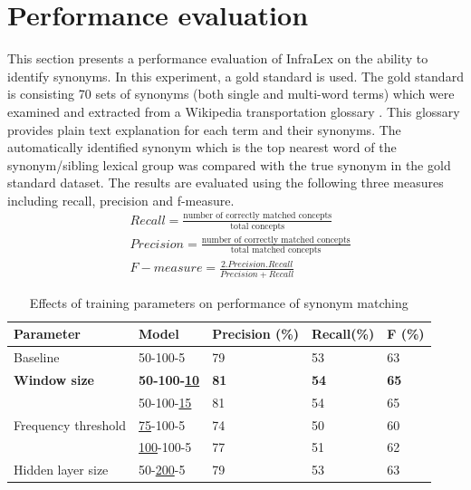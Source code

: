 \documentclass[Journal, InsideFigs, DoubleSpace]{ascelike} %
\begin{document}
\section{Performance evaluation} \label{sec:eval_infralex}
This section presents a performance evaluation of InfraLex on the ability to identify synonyms. In this experiment, a gold standard  is used. The gold standard is consisting 70 sets of synonyms (both single and multi-word terms) which were examined and extracted from a Wikipedia transportation glossary \cite{wikipedia16}. This glossary provides plain text explanation for each term and their synonyms. The automatically identified synonym which is the top nearest word of the synonym/sibling lexical group was compared with the true synonym in the gold standard dataset. The results are evaluated using the following three measures including recall, precision and f-measure.
%
\begin{align} 
&Recall = \frac{\text{number of correctly matched concepts}}{\text{total concepts}}  \\ 
&Precision = \frac{\text{number of correctly matched concepts}}{\text{total matched concepts}}  \\
&F-measure = \frac{2.Precision.Recall}{Precision+Recall}
\end{align}
\begin{table} [b] 
	\caption{Effects of training parameters on performance of synonym matching}
	\label{table:eval_syn_par_effect}
	\centering
	\small
	\renewcommand{\arraystretch}{1.25}
	\begin{tabular}{l l l l l }
		\hline
		\hline
		\textbf{Parameter} & \textbf{Model} & \textbf{Precision (\%)}  & \textbf{Recall(\%)} & \textbf{F (\%)}\\
		\hline
		Baseline	&	50-100-5	&79		&53		&63\\
		\hline
		\textbf{Window size}	&\textbf{50-100-\underline{10}}	&\textbf{81}		&\textbf{54}		&\textbf{65}\\
		&50-100-\underline{15}	&81		&54		&65\\
		\hline		
		Frequency threshold	&\underline{75}-100-5	&74		&50		&60\\
		&\underline{100}-100-5	&77		&51		&62\\
		\hline
		Hidden layer size	&50-\underline{200}-5	&79		&53		&63\\
		\hline
		\hline
	\end{tabular}
	\normalsize
\end{table}
\par
\end{document}
